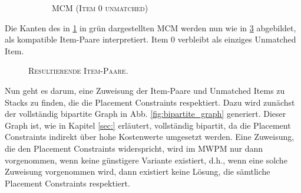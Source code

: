 \begin{figure}[H]
\begin{subfigure}[b]{0.4\textwidth}
    \caption{\textsc{MCM (Item $0$ unmatched)}}
    \label{fig:stacking_const_graph_example_b=2_b}
    \end{subfigure}
    \caption{}
    \label{fig:stacking_const_graph_example_b=2}
\end{figure}

Die Kanten des in \ref{fig:stacking_const_graph_example_b=2_b} in grün dargestellten \textsc{MCM} werden nun wie in \ref{fig:item_pairs_b=2}
abgebildet, als kompatible Item-Paare interpretiert. Item $0$ verbleibt als einziges Unmatched Item.

\begin{figure}[H]
\centering
{}
  \caption{\textsc{Resultierende Item-Paare.}}
  \label{fig:item_pairs_b=2}
\end{figure}

Nun geht es darum, eine Zuweisung der Item-Paare und Unmatched Items zu Stacks zu finden, die die Placement Constraints
respektiert. Dazu wird zunächst der vollständig bipartite Graph in Abb. \ref{fig:bipartite_graph} generiert.
Dieser Graph ist, wie in Kapitel \ref{sec:} erläutert, vollständig bipartit, da die Placement Constraints indirekt
über hohe Kostenwerte umgesetzt werden. Eine Zuweisung, die den Placement Constraints widerspricht, wird im \textsc{MWPM}
nur dann vorgenommen, wenn keine günstigere Variante existiert, d.h., wenn eine solche Zuweisung vorgenommen wird,
dann existiert keine Lösung, die sämtliche Placement Constraints respektiert.

